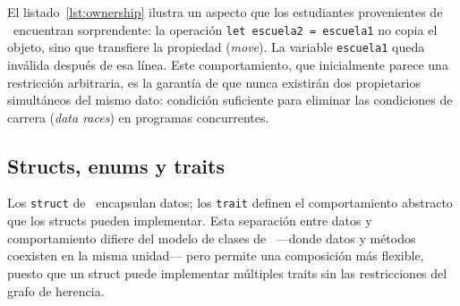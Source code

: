 \noindent
El listado~\ref{lst:ownership} ilustra un aspecto que los estudiantes provenientes
de \java\ encuentran sorprendente: la operación \texttt{let escuela2 = escuela1}
no copia el objeto, sino que transfiere la propiedad (\textit{move}). La variable
\texttt{escuela1} queda inválida después de esa línea. Este comportamiento, que
inicialmente parece una restricción arbitraria, es la garantía de que nunca
existirán dos propietarios simultáneos del mismo dato: condición suficiente para
eliminar las condiciones de carrera (\textit{data races}) en programas concurrentes.

\subsection{Structs, enums y traits}
\label{subsec:structs-traits}

Los \texttt{struct} de \rust\ encapsulan datos; los \texttt{trait} definen el
comportamiento abstracto que los structs pueden implementar. Esta separación entre
datos y comportamiento difiere del modelo de clases de \java\ ---donde datos y métodos
coexisten en la misma unidad--- pero permite una composición más flexible, puesto que
un struct puede implementar múltiples traits sin las restricciones del grafo de herencia.

